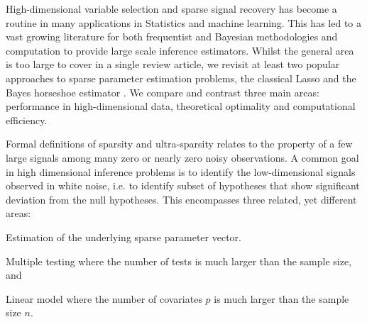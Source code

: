 \documentclass[11pt]{article}
\begin{document}


High-dimensional variable selection and sparse signal recovery has become a routine in many applications in Statistics and machine learning. This has led to a vast growing literature for both frequentist and Bayesian methodologies and computation to provide large scale inference estimators. Whilst the general area is too large to cover in a single review article, we revisit at least two popular approaches to sparse parameter estimation problems, the classical Lasso \citep{tibshirani96} and the Bayes horseshoe estimator \citep{carvalho2010horseshoe}. We compare and contrast three main areas: performance in high-dimensional data, theoretical optimality and computational efficiency. 

Formal definitions of sparsity and ultra-sparsity relates to the property of a few large signals among many zero or nearly zero noisy observations. A common goal in high dimensional inference problems is to identify the low-dimensional signals observed in white noise, i.e. to identify subset of hypotheses that show significant deviation from the null hypotheses. This encompasses three related, yet different areas: 
\ben
\item Estimation of the underlying sparse parameter vector. 
\item Multiple testing where the number of tests is much larger than the sample size, and 
\item Linear model where the number of covariates $p$ is much larger than the sample size $n$. 
\een
\end{document}
